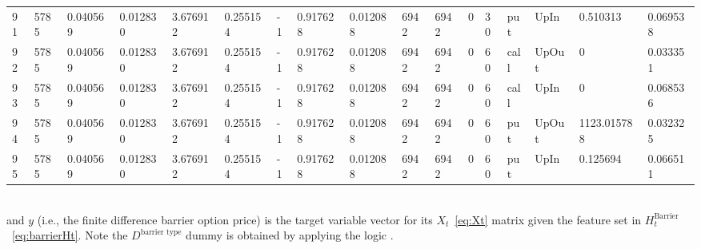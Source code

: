 \begin{table}[ht]
{\begin{tabular}{lllllllllllllllll}
			91 & 5785 & 0.040569 & 0.012830 & 3.676912 & 0.255154 & -1 & 0.917628 & 0.012088 & 6942 & 6942 & 0 & 30 & put & UpIn & 0.510313 & 0.069538 \\
			92 & 5785 & 0.040569 & 0.012830 & 3.676912 & 0.255154 & -1 & 0.917628 & 0.012088 & 6942 & 6942 & 0 & 60 & call & UpOut & 0 & 0.033351 \\
			93 & 5785 & 0.040569 & 0.012830 & 3.676912 & 0.255154 & -1 & 0.917628 & 0.012088 & 6942 & 6942 & 0 & 60 & call & UpIn & 0 & 0.068536 \\
			94 & 5785 & 0.040569 & 0.012830 & 3.676912 & 0.255154 & -1 & 0.917628 & 0.012088 & 6942 & 6942 & 0 & 60 & put & UpOut & 1123.015788 & 0.032325 \\
			95 & 5785 & 0.040569 & 0.012830 & 3.676912 & 0.255154 & -1 & 0.917628 & 0.012088 & 6942 & 6942 & 0 & 60 & put & UpIn & 0.125694 & 0.066511 \\
			\bottomrule
		\end{tabular}
	}
\end{table} \\
and $y$ (i.e., the finite difference barrier option price) is the target variable vector for its $X_{t}$~\eqref{eq:Xt} matrix given the feature set in $H_{t}^{\text{Barrier}}$~\eqref{eq:barrierHt}. Note the $D^{\text{barrier type}}$ dummy is obtained by applying the logic .
\newpage
